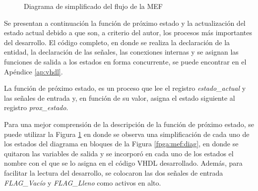 \begin{figure}[t]
	\caption{Diagrama de simplificado del flujo de la MEF}
	\label{fpga:mef:simple}
\end{figure}

Se presentan a continuación la función de próximo estado y la actualización del estado actual debido a que son, a criterio del autor, los procesos más importantes del desarrollo. El código completo, en donde se realiza la declaración de la entidad, la declaración de las señales, las conexiones internas y se asignan las funciones de salida a los estados en forma concurrente, se puede encontrar en el Apéndice \ref{ap:vhdl}.

La función de próximo estado, es un proceso que lee el registro \textit{estado\_actual} y las señales de entrada y, en función de su valor, asigna el estado siguiente al registro \textit{prox\_estado}.

Para una mejor comprensión de la descripción de la función de próximo estado, se puede utilizar la Figura \ref{fpga:mef:simple} en donde se observa una simplificación de cada uno de los estados del diagrama en bloques de la Figura \ref{fpga:mef:diag}, en donde se quitaron las variables de salida y se incorporó en cada uno de los estados el nombre con el que se lo asigna en el código VHDL desarrollado. Además, para facilitar la lectura del desarrollo, se colocaron las dos señales de entrada \textit{FLAG\_Vacío} y \textit{FLAG\_Lleno} como activos en alto.

